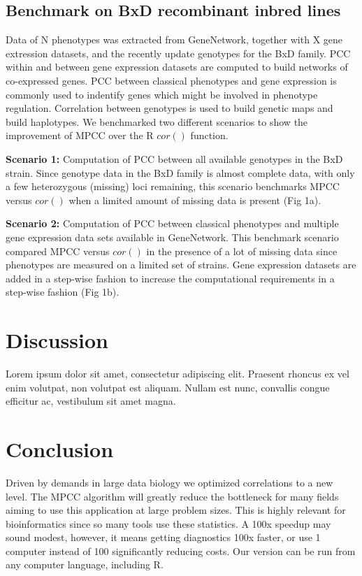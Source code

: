 \documentclass{bioinfo}
\begin{document}
\begin{methods}
\subsection{Benchmark on BxD recombinant inbred lines}
Data of N phenotypes was extracted from GeneNetwork, together with 
X gene extression datasets, and the recently update genotypes for 
the BxD family. PCC within and between gene expression datasets are 
computed to build networks of co-expressed genes. PCC between 
classical phenotypes and gene expression is commonly used to 
indentify genes which might be involved in phenotype regulation. 
Correlation between genotypes is used to build genetic maps and 
build haplotypes. We benchmarked two different scenarios to show 
the improvement of MPCC over the R $cor()$ function.

{\bf Scenario 1:} Computation of PCC between all available genotypes 
in the BxD strain. Since genotype data in the BxD family is almost 
complete data, with only a few heterozygous (missing) loci remaining, 
this scenario benchmarks MPCC versus $cor()$ when a limited amount of 
missing data is present (Fig 1a).

{\bf Scenario 2:} Computation of PCC between classical phenotypes and 
multiple gene expression data sets available in GeneNetwork. This 
benchmark scenario compared MPCC versus $cor()$ in the presence of 
a lot of missing data since phenotypes are measured on a limited set 
of strains. Gene expression datasets are added in a step-wise fashion 
to increase the computational requirements in a step-wise fashion 
(Fig 1b).

\end{methods}

\section{Discussion}

Lorem ipsum dolor sit amet, consectetur adipiscing elit. Praesent 
rhoncus ex vel enim volutpat, non volutpat est aliquam. Nullam est 
nunc, convallis congue efficitur ac, vestibulum sit amet magna.

\section{Conclusion}

Driven by demands in large data biology we optimized correlations to a new level. 
The MPCC algorithm will greatly reduce the bottleneck for many fields aiming to 
use this application at large problem sizes. This is highly relevant for 
bioinformatics since so many tools use these statistics. A 100x speedup may sound
modest, however, it means getting diagnostics 100x faster, or use 1 computer 
instead of 100 significantly reducing costs. Our version can be run from any 
computer language, including R.
\end{document}
